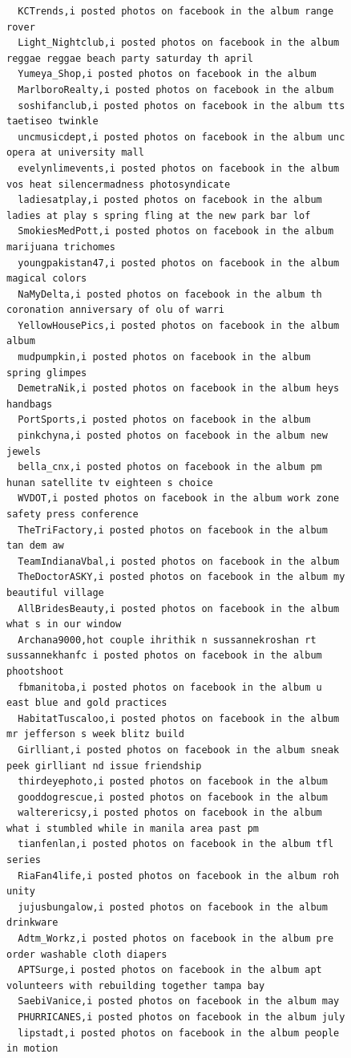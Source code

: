 \begin{figure}[htpb]
\begin{verbatim}
  KCTrends,i posted photos on facebook in the album range rover
  Light_Nightclub,i posted photos on facebook in the album reggae reggae beach party saturday th april
  Yumeya_Shop,i posted photos on facebook in the album
  MarlboroRealty,i posted photos on facebook in the album
  soshifanclub,i posted photos on facebook in the album tts taetiseo twinkle
  uncmusicdept,i posted photos on facebook in the album unc opera at university mall
  evelynlimevents,i posted photos on facebook in the album vos heat silencermadness photosyndicate
  ladiesatplay,i posted photos on facebook in the album ladies at play s spring fling at the new park bar lof
  SmokiesMedPott,i posted photos on facebook in the album marijuana trichomes
  youngpakistan47,i posted photos on facebook in the album magical colors
  NaMyDelta,i posted photos on facebook in the album th coronation anniversary of olu of warri
  YellowHousePics,i posted photos on facebook in the album album
  mudpumpkin,i posted photos on facebook in the album spring glimpes
  DemetraNik,i posted photos on facebook in the album heys handbags
  PortSports,i posted photos on facebook in the album
  pinkchyna,i posted photos on facebook in the album new jewels
  bella_cnx,i posted photos on facebook in the album pm hunan satellite tv eighteen s choice
  WVDOT,i posted photos on facebook in the album work zone safety press conference
  TheTriFactory,i posted photos on facebook in the album tan dem aw
  TeamIndianaVbal,i posted photos on facebook in the album
  TheDoctorASKY,i posted photos on facebook in the album my beautiful village
  AllBridesBeauty,i posted photos on facebook in the album what s in our window
  Archana9000,hot couple ihrithik n sussannekroshan rt sussannekhanfc i posted photos on facebook in the album phootshoot
  fbmanitoba,i posted photos on facebook in the album u east blue and gold practices
  HabitatTuscaloo,i posted photos on facebook in the album mr jefferson s week blitz build
  Girlliant,i posted photos on facebook in the album sneak peek girlliant nd issue friendship
  thirdeyephoto,i posted photos on facebook in the album
  gooddogrescue,i posted photos on facebook in the album
  walterericsy,i posted photos on facebook in the album what i stumbled while in manila area past pm
  tianfenlan,i posted photos on facebook in the album tfl series
  RiaFan4life,i posted photos on facebook in the album roh unity
  jujusbungalow,i posted photos on facebook in the album drinkware
  Adtm_Workz,i posted photos on facebook in the album pre order washable cloth diapers
  APTSurge,i posted photos on facebook in the album apt volunteers with rebuilding together tampa bay
  SaebiVanice,i posted photos on facebook in the album may
  PHURRICANES,i posted photos on facebook in the album july
  lipstadt,i posted photos on facebook in the album people in motion


\end{verbatim}
\end{figure}

